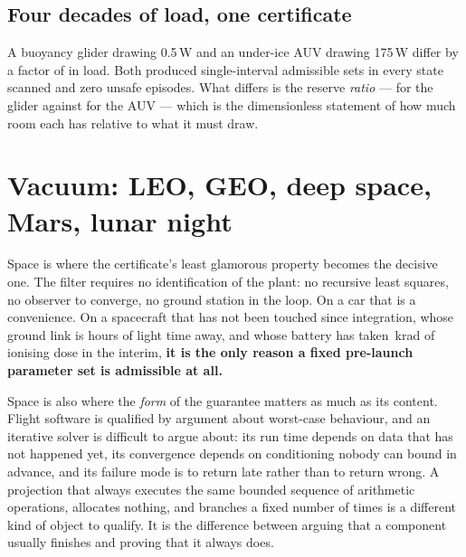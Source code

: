 \documentclass[11pt,letterpaper]{article}
\theoremstyle{definition}
\theoremstyle{remark}
\begin{document}
\subsection{Four decades of load, one certificate}

A buoyancy glider drawing 0.5\,W and an under-ice AUV drawing 175\,W differ by a factor of
\uLoadRatio{} in load. Both produced single-interval admissible sets in every state scanned and
zero unsafe episodes. What differs is the reserve \emph{ratio} --- \uGliderRatio{} for the
glider against \uAuvRatio{} for the AUV --- which is the dimensionless statement of how much
room each has relative to what it must draw.

\section{Vacuum: LEO, GEO, deep space, Mars, lunar night}\label{sec:space}

Space is where the certificate's least glamorous property becomes the decisive one. The filter
requires no identification of the plant: no recursive least squares, no observer to converge, no
ground station in the loop. On a car that is a convenience. On a spacecraft that has not been
touched since integration, whose ground link is hours of light time away, and whose battery has
taken \sDoseMax{}\,krad of ionising dose in the interim, \textbf{it is the only reason a fixed
pre-launch parameter set is admissible at all.}

Space is also where the \emph{form} of the guarantee matters as much as its content. Flight
software is qualified by argument about worst-case behaviour, and an iterative solver is
difficult to argue about: its run time depends on data that has not happened yet, its
convergence depends on conditioning nobody can bound in advance, and its failure mode is to
return late rather than to return wrong. A projection that always executes the same bounded
sequence of arithmetic operations, allocates nothing, and branches a fixed number of times is a
different kind of object to qualify. It is the difference between arguing that a component
usually finishes and proving that it always does.
\end{document}
